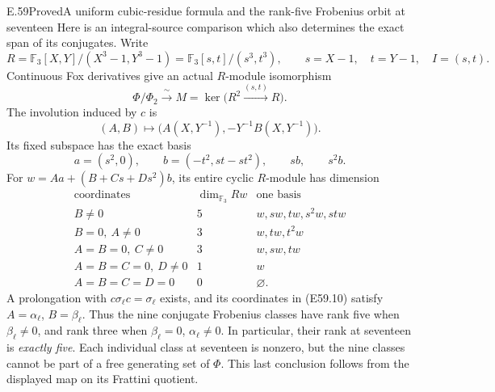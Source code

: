 \begin{statement}{E.59}{Proved}{A uniform cubic-residue formula and the rank-five Frobenius orbit at seventeen}
Here is an integral-source comparison which
also determines the exact span of its conjugates.
Write
\[
 R=\mathbb F_3[X,Y]/(X^3-1,Y^3-1)
   =\mathbb F_3[s,t]/(s^3,t^3),\qquad
 s=X-1,\quad t=Y-1,\quad I=(s,t).
 \tag{E59.7}
\]
Continuous Fox derivatives give an actual
$R$-module isomorphism
\[
 \Phi/\Phi_2
       \xrightarrow{\ \sim\ }
 M=\ker\bigl(R^2\xrightarrow{(s,t)}R\bigr).
 \tag{E59.8}
\]
The involution induced by $c$ is
\[
 (A,B)\longmapsto
  \bigl(A(X,Y^{-1}),-Y^{-1}B(X,Y^{-1})\bigr).
 \tag{E59.9}
\]
Its fixed subspace has the exact basis
\[
 a=(s^2,0),\qquad
 b=(-t^2,st-st^2),\qquad sb,\qquad s^2b.
 \tag{E59.10}
\]
For
$w=Aa+(B+Cs+Ds^2)b$, its entire cyclic
$R$-module has dimension
\[
 \begin{array}{c|c|c}
 \text{coordinates}&\dim_{\mathbb F_3}Rw&
                       \text{one basis}\\ \hline
 B\ne0&5&w,sw,tw,s^2w,stw\\
 B=0,\ A\ne0&3&w,tw,t^2w\\
 A=B=0,\ C\ne0&3&w,sw,tw\\
 A=B=C=0,\ D\ne0&1&w\\
 A=B=C=D=0&0&\varnothing .
 \end{array}
 \tag{E59.11}
\]
A prolongation with $c\sigma_\ell c=\sigma_\ell$
exists, and its coordinates in (E59.10) satisfy
$A=\alpha_\ell$, $B=\beta_\ell$.
Thus the nine conjugate Frobenius classes have
rank five when $\beta_\ell\ne0$, and rank three
when $\beta_\ell=0$, $\alpha_\ell\ne0$.
In particular, their rank at seventeen is
\emph{exactly five}. Each individual class at
seventeen is nonzero, but the nine classes
cannot be part of a free generating set of
$\Phi$. This last conclusion follows from
the displayed map on its Frattini quotient.


\end{statement}
